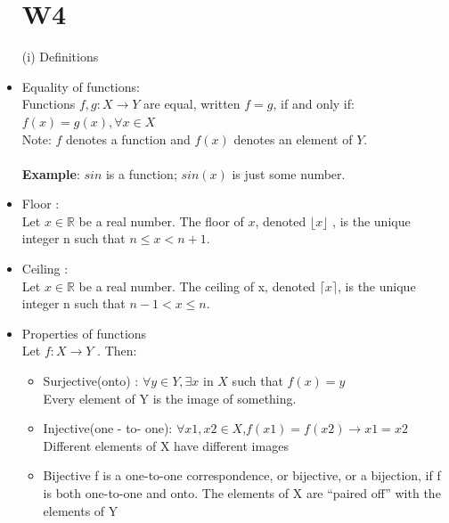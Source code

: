 \documentclass{article}
\begin{document}
\begin{itemize}
\section{W4}

(i) Definitions
\item Equality of functions: \\
Functions $f , g : X \rightarrow Y$ are equal, written $f = g$, if and only if:\\
$f(x) = g(x) ,  \forall x \in X$\\
Note: $f$ denotes a function and $f(x)$ denotes an element of $Y$.\\\\
\textbf{Example}: $sin$ is a function; $sin(x)$ is just some number.

\item Floor :\\
Let $x \in \mathbb{R}$ be a real number. The floor of $x$, denoted $\lfloor x \rfloor$
 , is the unique integer n such that $n \leq x < n + 1$.
 \item Ceiling :\\
 Let $x \in \mathbb{R} $ be a real number. The ceiling of x, denoted $\lceil x \rceil$, is the unique
integer n such that $n-1 < x \leq n$.
\item Properties of functions \\
Let $f : X \rightarrow Y$ . Then:\\
\begin{itemize}

\item Surjective(onto) : 
$\forall y \in Y ,\exists x$ in $X$ such that $f(x) = y$\\Every element of Y is the image of something.

\item Injective(one - to- one):
$\forall x1,x2 \in X$,$f(x1) = f(x2) \rightarrow x1 = x2$\\Different elements of X have different images

\item Bijective
f is a one-to-one correspondence, or bijective, or a bijection, if f is
both one-to-one and onto.
The elements of X are “paired off” with the elements of Y\\


\end{itemize}
\end{itemize}
\end{document}
